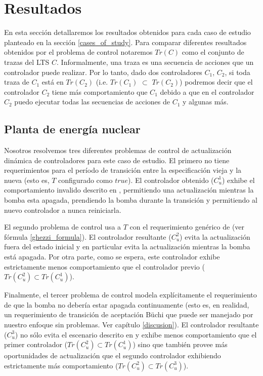 \section{Resultados}

En esta sección detallaremos los resultados obtenidos para cada caso de estudio planteado en la sección
\ref{cases_of_study}. Para comparar diferentes resultados obtenidos por el problema de control notaremos $Tr(C)$ como el
conjunto de trazas del LTS $C$. Informalmente, una traza es una secuencia de acciones que un controlador puede
realizar. Por lo tanto, dado dos controladores $C_1$, $C_2$, si toda traza de $C_1$ está en $Tr(C_2)$ (i.e. $Tr(C_1)$
$\subset$ $Tr(C_2)$) podremos decir que el controlador $C_2$ tiene más comportamiento que $C_1$ debido a que en el controlador
$C_2$ puedo ejecutar todas las secuencias de acciones de $C_1$ y algunas más.

\subsection{Planta de energía nuclear}

Nosotros resolvemos tres diferentes problemas de control de actualización dinámica de controladores para este caso de
estudio. El primero no tiene requerimientos para el período de transición entre la especificación vieja y la nueva (esto
es, $T$ configurado como $true$). El controlador obtenido ($C^1_u$) exhibe el comportamiento invalido descrito en
\cite{PanzicaLaManna:2013:FCC:2487336.2487349}, permitiendo una actualización mientras la bomba esta apagada, prendiendo
la bomba durante la transición y permitiendo al nuevo controlador a nunca reiniciarla.

El segundo problema de control usa a $T$ con el requerimiento genérico de \cite{6224401} (ver fórmula
\ref{ghezzi_formula}). El controlador resultante ($C_u^{2}$) evita la actualización fuera del estado inicial y en
particular evita la actualización mientras la bomba está apagada. Por otra parte, como se espera, este controlador exhibe
estrictamente menos comportamiento que el controlador previo ($Tr(C^2_u) \subset Tr(C^1_u)$).

Finalmente, el tercer problema de control modela explícitamente el requerimiento de que la bomba no debería estar
apagada continuamente (esto es, en realidad, un requerimiento de transición de aceptación Büchi que puede ser manejado
por nuestro enfoque sin problemas. Ver capítulo \ref{discusion}). El controlador resultante ($C^3_u$) no sólo evita el
escenario descrito en \cite{PanzicaLaManna:2013:FCC:2487336.2487349} y exhibe menos comportamiento que el primer
controlador ($Tr(C^2_u) \subset Tr(C^1_u)$) sino que también provee más oportunidades de actualización que el segundo
controlador exhibiendo estrictamente más comportamiento ($Tr(C^2_u) \subset Tr(C^3_u)$). 

